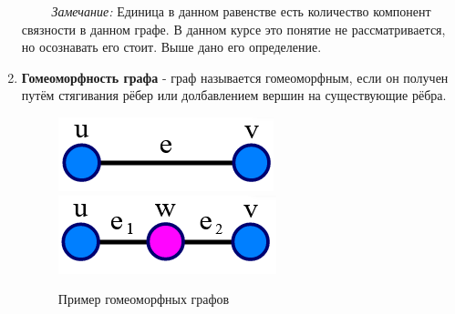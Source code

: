 \documentclass[a4paper,12pt]{article}
\begin{document}
\begin{enumerate}
            $\qquad$ \textit{Замечание:} Единица в данном равенстве есть количество компонент связности в данном графе. В данном курсе это понятие не рассматривается, но осознавать его стоит. Выше дано его определение.
            \item \textbf{Гомеоморфность графа} - граф называется гомеоморфным, если он получен путём стягивания рёбер или долбавлением вершин на существующие рёбра.
            \begin{figure}[ht]

                    \centering
                    
                    \includegraphics[scale=0.7]{ex61.png}
                    \includegraphics[scale=0.7]{ex62.png}
                    \caption{Пример гомеоморфных графов}
                    
                    \label{fig:GG}
                
            \end{figure}
        \end{enumerate}
\end{document}
